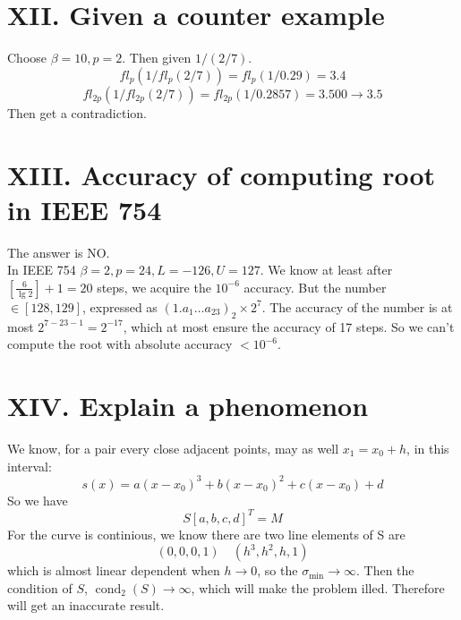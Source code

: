 \documentclass[a4paper]{article}
\begin{document}
\section*{XII. Given a counter example}
Choose $\beta = 10, p = 2$. Then given $1/(2/7)$.
\[
fl_p(1/fl_p(2/7)) = fl_p(1/0.29) = 3.4
\]
\[
fl_{2p}(1/fl_{2p}(2/7)) = fl_{2p}(1/0.2857) = 3.500 \rightarrow 3.5
\]
Then get a contradiction.
\section*{XIII. Accuracy of computing root in IEEE 754}
The answer is NO. \\
In IEEE 754 $\beta = 2,p = 24,L = -126,U=127$. We know at least after $[\frac{6}{\lg 2}] + 1 = 20$ steps,
we acquire the $10^{-6}$ accuracy. But the number $\in [128,129]$, expressed as 
$ (1.a_1\ldots a_{23})_2 \times 2^{7}$. The accuracy of the number is at most $2^{7-23-1} = 2^{-17}$, which
at most ensure the accuracy of 17 steps. So we can't compute the root with absolute
accuracy $< 10^{-6}$.

\section*{XIV. Explain a phenomenon}
We know, for a pair every close adjacent points, may as well $x_1 = x_0 + h$, in this interval:
\[
s(x) = a(x-x_0)^3 + b(x-x_0)^2 + c(x-x_0) + d
\]
So we have
\[
S[a,b,c,d]^T = M
\]
For the curve is continious, we know there are two line elements of S are
\[
(0,0,0,1) \quad (h^3,h^2,h,1)
\]
which is almost linear dependent when $h \to 0$, so the $\sigma_{\min} \to \infty$.
Then the condition of $S$, $\operatorname{cond}_2(S) \to \infty$, which will make the  problem illed.
Therefore will get an inaccurate result.
\end{document}
